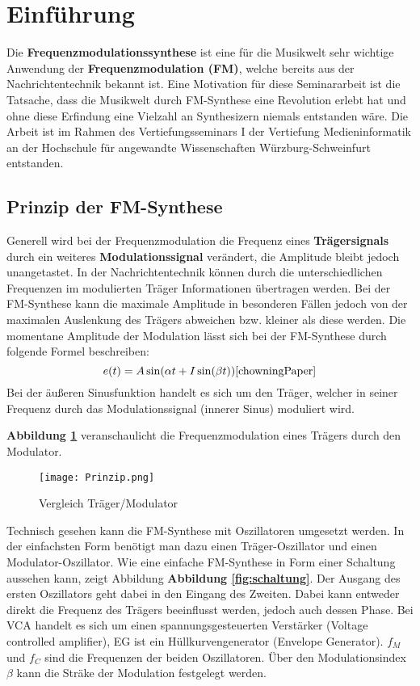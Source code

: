 \newpage
\section{Einführung}
Die \textbf{Frequenzmodulationssynthese} ist eine für die Musikwelt sehr wichtige Anwendung der \textbf{Frequenzmodulation (FM)}, welche bereits aus der Nachrichtentechnik bekannt ist. Eine Motivation für diese Seminararbeit ist die Tatsache, dass die Musikwelt durch FM-Synthese eine Revolution erlebt hat und ohne diese Erfindung eine Vielzahl an Synthesizern niemals entstanden wäre. Die Arbeit ist im Rahmen des Vertiefungsseminars I der Vertiefung Medieninformatik an der Hochschule für angewandte Wissenschaften Würzburg-Schweinfurt entstanden. %
\FloatBarrier
\subsection{Prinzip der FM-Synthese}
\label{PrinzipFM}
Generell wird bei der Frequenzmodulation die Frequenz eines \textbf{Trägersignals} durch ein weiteres \textbf{Modulationssignal} verändert, die Amplitude bleibt jedoch unangetastet. In der Nachrichtentechnik können durch die unterschiedlichen Frequenzen im modulierten Träger Informationen übertragen werden. Bei der FM-Synthese kann die maximale Amplitude in besonderen Fällen jedoch von der maximalen Auslenkung des Trägers abweichen bzw. kleiner als diese werden. 
Die momentane Amplitude der Modulation lässt sich bei der FM-Synthese durch folgende Formel beschreiben:
\[
e(t) = A\sin(\alpha t + I\sin(\beta t)) \cite{chowningPaper}
\]
Bei der äußeren Sinusfunktion handelt es sich um den Träger, welcher in seiner Frequenz durch das Modulationssignal (innerer Sinus) moduliert wird.

\textbf{Abbildung \ref{fig:vergleichSignale}} veranschaulicht die Frequenzmodulation eines Trägers durch den Modulator.

\begin{figure} [ht]
\centering
  \texttt{[image: Prinzip.png]}
\caption{Vergleich Träger/Modulator}
\label{fig:vergleichSignale}
\end{figure}
\FloatBarrier

Technisch gesehen kann die FM-Synthese mit Oszillatoren umgesetzt werden. In der einfachsten Form benötigt man dazu einen Träger-Oszillator und einen Modulator-Oszillator. Wie eine einfache FM-Synthese in Form einer Schaltung aussehen kann, zeigt Abbildung \textbf{Abbildung \ref{fig:schaltung}}. Der Ausgang des ersten Oszillators geht dabei in den Eingang des Zweiten. Dabei kann entweder direkt die Frequenz des Trägers beeinflusst werden, jedoch auch dessen Phase. Bei VCA handelt es sich um einen spannungsgesteuerten Verstärker (Voltage controlled amplifier), EG ist ein Hüllkurvengenerator (Envelope Generator). $f_M$ und $f_C$ sind die Frequenzen der beiden Oszillatoren. Über den Modulationsindex $\beta$ kann die Sträke der Modulation festgelegt werden. 

